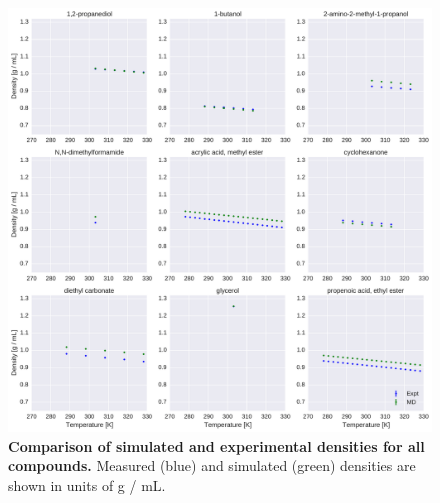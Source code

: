 \documentclass[aps,pre,twocolumn,nofootinbib,superscriptaddress,linenumbers]{revtex4-1}
\begin{document}
\begin{figure}[alldensity]

\includegraphics[width=\textwidth]{./figures/densities_versus_temperature_part0.pdf}

\caption{{\bf Comparison of simulated and experimental densities for all compounds.} 
Measured (blue) and simulated (green) densities are shown in units of g / mL.
\label{figure:AllDensities}
}

\end{figure}
\end{document}
